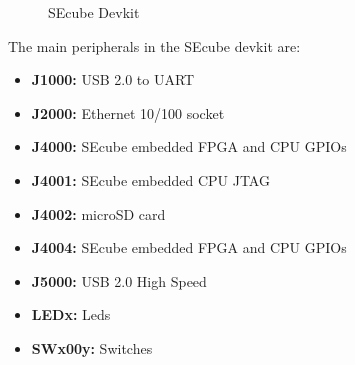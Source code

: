 \begin{figure}[ht]
  \centering
  \caption{SEcube Devkit}
 \label{fig:devboard}
\end{figure}

The main peripherals in the SEcube devkit are:

\begin{itemize}
\setlength\itemsep{0pt}
\item \textbf{J1000: }\tabto{2.3cm} USB 2.0 to UART 
\item \textbf{J2000: }\tabto{2.3cm} Ethernet 10/100 socket 
\item \textbf{J4000: }\tabto{2.3cm} SEcube embedded FPGA and CPU GPIOs
\item \textbf{J4001: }\tabto{2.3cm} SEcube embedded CPU JTAG
\item \textbf{J4002: }\tabto{2.3cm} microSD card 
\item \textbf{J4004: }\tabto{2.3cm} SEcube embedded FPGA and CPU GPIOs
\item \textbf{J5000: }\tabto{2.3cm} USB 2.0 High Speed 
\item \textbf{LEDx:  }\tabto{2.3cm} Leds 
\item \textbf{SWx00y:}\tabto{2.3cm} Switches 
\end{itemize}


